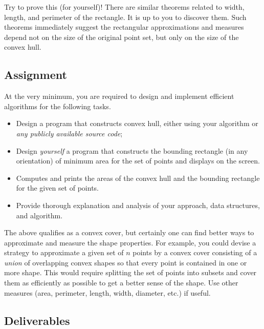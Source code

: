 \documentclass[]{article}
\begin{document}
\vspace{6pt} \noindent Try to prove this (for yourself)!
There are similar theorems related to width, length, and perimeter
of the rectangle.  It is up to you to discover them.  Such
theorems immediately suggest the rectangular approximations and
measures depend not on the size of the original point set, but only
on the size of the convex hull.


\subsection* {Assignment}



At the very minimum,  you are required to design and implement efficient algorithms for the following tasks. 
\begin{itemize}
\item
Design a program that constructs  convex hull, either using your
algorithm or {\em any publicly available source code};
\item
Design {\em yourself\/} a program that constructs the bounding rectangle (in any orientation)
of minimum area for the set of points and displays on the screen.
\item
Computes and prints the areas of the convex hull and the bounding
rectangle for the given set of points.
\item
Provide thorough explanation and analysis of your approach, data structures, and
algorithm.
\end{itemize}


The above qualifies as a convex cover, but certainly one
can find better ways to approximate and measure the shape properties. 
For example,  you could devise a strategy to approximate a given set of $n$ points by a convex cover consisting of a {\em union\/} of 
overlapping convex shapes so that every point is contained in one or more shape.
This would require splitting the set of points
into subsets and cover them as efficiently as possible to get
a better sense of the shape.  Use other measures (area, perimeter, length,
width, diameter, etc.) if useful.



\subsection*{Deliverables}
\end{document}
